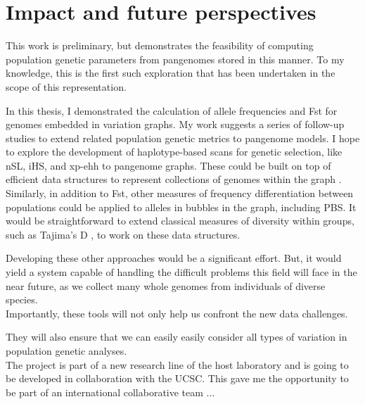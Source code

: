 



\section{Impact and future perspectives}
This work is preliminary, but demonstrates the feasibility of computing population genetic parameters from pangenomes stored in this manner. To my knowledge, this is the first such exploration that has been undertaken in the scope of this representation.

In this thesis, I demonstrated the calculation of allele frequencies and Fst for genomes embedded in variation graphs.
My work suggests a series of follow-up studies to extend related population genetic metrics to pangenome models.
I hope to explore the development of haplotype-based scans for genetic selection, like nSL, iHS, and xp-ehh to pangenome graphs.
These could be built on top of efficient data structures to represent collections of genomes within the graph \cite{Siren_2019}.
Similarly, in addition to Fst, other measures of frequency differentiation between populations could be applied to alleles in bubbles in the graph, including PBS. %
It would be straightforward to extend classical measures of diversity within groups, such as Tajima's D \cite{korneliussen2013calculation}, to work on these data structures.

Developing these other approaches would be a significant effort.
But, it would yield a system capable of handling the difficult problems this field will face in the near future, as we collect many whole genomes from individuals of diverse species.\\
Importantly, these tools will not only help us confront the new data challenges.


They will also ensure that we can easily easily consider all types of variation in population genetic analyses.\\


The project is part of a new research line of the host laboratory and is going to be developed in collaboration with the UCSC. This gave me the opportunity to be part of an international collaborative team ... 